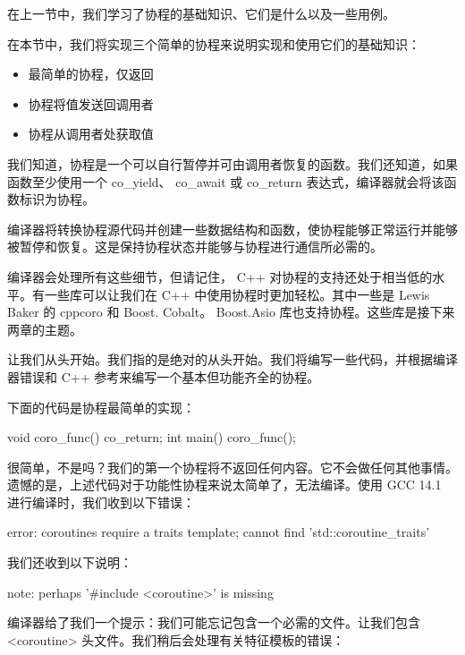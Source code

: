 
在上一节中，我们学习了协程的基础知识、它们是什么以及一些用例。

在本节中，我们将实现三个简单的协程来说明实现和使用它们的基础知识：

\begin{itemize}
\item
最简单的协程，仅返回

\item
协程将值发送回调用者

\item
协程从调用者处获取值
\end{itemize}


我们知道，协程是一个可以自行暂停并可由调用者恢复的函数。我们还知道，如果函数至少使用一个 co\_yield、 co\_await 或 co\_return 表达式，编译器就会将该函数标识为协程。

编译器将转换协程源代码并创建一些数据结构和函数，使协程能够正常运行并能够被暂停和恢复。这是保持协程状态并能够与协程进行通信所必需的。

编译器会处理所有这些细节，但请记住， C++ 对协程的支持还处于相当低的水平。有一些库可以让我们在 C++ 中使用协程时更加轻松。其中一些是 Lewis Baker 的 cppcoro 和 Boost.
Cobalt。 Boost.Asio 库也支持协程。这些库是接下来两章的主题。

让我们从头开始。我们指的是绝对的从头开始。我们将编写一些代码，并根据编译器错误和 C++ 参考来编写一个基本但功能齐全的协程。

下面的代码是协程最简单的实现：

\begin{cpp}
void coro_func() {
    co_return;
}
int main() {
    coro_func();
}
\end{cpp}

很简单，不是吗？我们的第一个协程将不返回任何内容。它不会做任何其他事情。遗憾的是，上述代码对于功能性协程来说太简单了，无法编译。使用 GCC 14.1 进行编译时，我们收到以下错误：

\begin{shell}
error: coroutines require a traits template; cannot find 'std::coroutine_traits'
\end{shell}

我们还收到以下说明：

\begin{shell}
note: perhaps '#include <coroutine>' is missing
\end{shell}

编译器给了我们一个提示：我们可能忘记包含一个必需的文件。让我们包含 <coroutine> 头文件。我们稍后会处理有关特征模板的错误：

